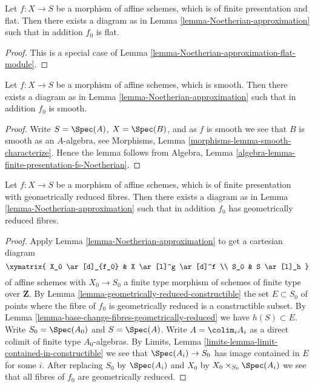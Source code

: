 \begin{lemma}
\label{lemma-Noetherian-approximation-flat}
Let $f : X \to S$ be a morphism of affine schemes, which is of finite
presentation and flat. Then there exists a diagram as in
Lemma \ref{lemma-Noetherian-approximation}
such that in addition $f_0$ is flat.
\end{lemma}

\begin{proof}
This is a special case of
Lemma \ref{lemma-Noetherian-approximation-flat-module}.
\end{proof}

\begin{lemma}
\label{lemma-Noetherian-approximation-smooth}
Let $f : X \to S$ be a morphism of affine schemes, which is smooth.
Then there exists a diagram as in
Lemma \ref{lemma-Noetherian-approximation}
such that in addition $f_0$ is smooth.
\end{lemma}

\begin{proof}
Write $S = \Spec(A)$, $X = \Spec(B)$, and
as $f$ is smooth we see that $B$ is smooth as an $A$-algebra, see
Morphisms,
Lemma \ref{morphisms-lemma-smooth-characterize}.
Hence the lemma follows from
Algebra, Lemma \ref{algebra-lemma-finite-presentation-fs-Noetherian}.
\end{proof}

\begin{lemma}
\label{lemma-Noetherian-approximation-geometrically-reduced}
Let $f : X \to S$ be a morphism of affine schemes, which is
of finite presentation with geometrically reduced fibres.
Then there exists a diagram as in
Lemma \ref{lemma-Noetherian-approximation}
such that in addition $f_0$ has geometrically reduced fibres.
\end{lemma}

\begin{proof}
Apply
Lemma \ref{lemma-Noetherian-approximation}
to get a cartesian diagram
$$
\xymatrix{
X_0 \ar[d]_{f_0} & X \ar[l]^g \ar[d]^f \\
S_0 & S \ar[l]_h
}
$$
of affine schemes with $X_0 \to S_0$ a finite type morphism of
schemes of finite type over $\mathbf{Z}$. By
Lemma \ref{lemma-geometrically-reduced-constructible}
the set $E \subset S_0$ of points where the fibre of
$f_0$ is geometrically reduced is a constructible subset. By
Lemma \ref{lemma-base-change-fibres-geometrically-reduced}
we have $h(S) \subset E$. Write $S_0 = \Spec(A_0)$ and
$S = \Spec(A)$. Write $A = \colim_i A_i$ as a
direct colimit of finite type $A_0$-algebras. By
Limits, Lemma \ref{limits-lemma-limit-contained-in-constructible}
we see that $\Spec(A_i) \to S_0$ has image contained in $E$
for some $i$. After replacing $S_0$ by $\Spec(A_i)$ and
$X_0$ by $X_0 \times_{S_0} \Spec(A_i)$ we see that
all fibres of $f_0$ are geometrically reduced.
\end{proof}

